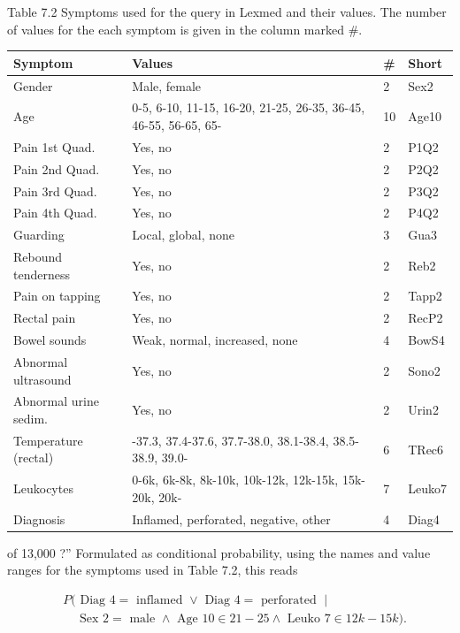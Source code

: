 \documentclass[10pt]{book}
\begin{document}
Table 7.2 Symptoms used for the query in Lexmed and their values. The number of values for the each symptom is given in the column marked \#.
\begin{center}
\begin{tabular}{|l|l|l|l|}
\hline
Symptom & Values & \# & Short \\
\hline
Gender & Male, female & 2 & Sex2 \\
\hline
Age & 0-5, 6-10, 11-15, 16-20, 21-25, 26-35, 36-45, 46-55, 56-65, 65- & 10 & Age10 \\
\hline
Pain 1st Quad. & Yes, no & 2 & P1Q2 \\
\hline
Pain 2nd Quad. & Yes, no & 2 & P2Q2 \\
\hline
Pain 3rd Quad. & Yes, no & 2 & P3Q2 \\
\hline
Pain 4th Quad. & Yes, no & 2 & P4Q2 \\
\hline
Guarding & Local, global, none & 3 & Gua3 \\
\hline
Rebound tenderness & Yes, no & 2 & Reb2 \\
\hline
Pain on tapping & Yes, no & 2 & Tapp2 \\
\hline
Rectal pain & Yes, no & 2 & RecP2 \\
\hline
Bowel sounds & Weak, normal, increased, none & 4 & BowS4 \\
\hline
Abnormal ultrasound & Yes, no & 2 & Sono2 \\
\hline
Abnormal urine sedim. & Yes, no & 2 & Urin2 \\
\hline
Temperature (rectal) & -37.3, 37.4-37.6, 37.7-38.0, 38.1-38.4, 38.5-38.9, 39.0- & 6 & TRec6 \\
\hline
Leukocytes & 0-6k, 6k-8k, 8k-10k, 10k-12k, 12k-15k, 15k-20k, 20k- & 7 & Leuko7 \\
\hline
Diagnosis & Inflamed, perforated, negative, other & 4 & Diag4 \\
\hline
\end{tabular}
\end{center}

of 13,000 ?'' Formulated as conditional probability, using the names and value ranges for the symptoms used in Table 7.2, this reads

$$
\begin{aligned}
& P(\text { Diag } 4=\text { inflamed } \vee \text { Diag } 4=\text { perforated } \mid \\
& \quad \text { Sex } 2=\text { male } \wedge \text { Age } 10 \in 21-25 \wedge \text { Leuko } 7 \in 12 k-15 k) .
\end{aligned}
$$
\end{document}
